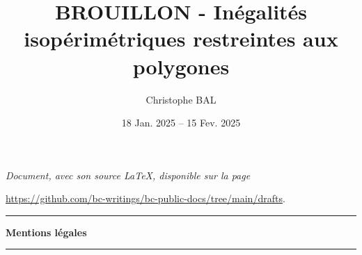 \documentclass[12pt]{amsart}
\begin{document}
\title{BROUILLON - Inégalités isopérimétriques restreintes aux polygones}
\author{Christophe BAL}
\date{18 Jan. 2025 -- 15 Fev. 2025}

\maketitle

\begin{center}
	\itshape
	Document, avec son source \LaTeX, disponible sur la page

	\url{https://github.com/bc-writings/bc-public-docs/tree/main/drafts}.
\end{center}


\bigskip


\begin{center}
	\hrule\vspace{.3em}
	{
		\fontsize{1.35em}{1em}\selectfont
		\textbf{Mentions \og légales \fg}
	}

	\vspace{0.45em}
	\doclicenseThis
	\hrule
\end{center}



\setcounter{tocdepth}{2}
\tableofcontents




\newpage
\end{document}
